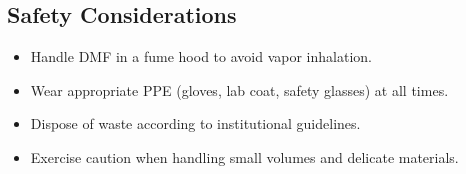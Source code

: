\documentclass[11pt]{article}
\begin{document}
\subsection*{Safety Considerations}

\begin{itemize}
    \item Handle DMF in a fume hood to avoid vapor inhalation.
    \item Wear appropriate PPE (gloves, lab coat, safety glasses) at all times.
    \item Dispose of waste according to institutional guidelines.
    \item Exercise caution when handling small volumes and delicate materials.
\end{itemize}
\end{document}
